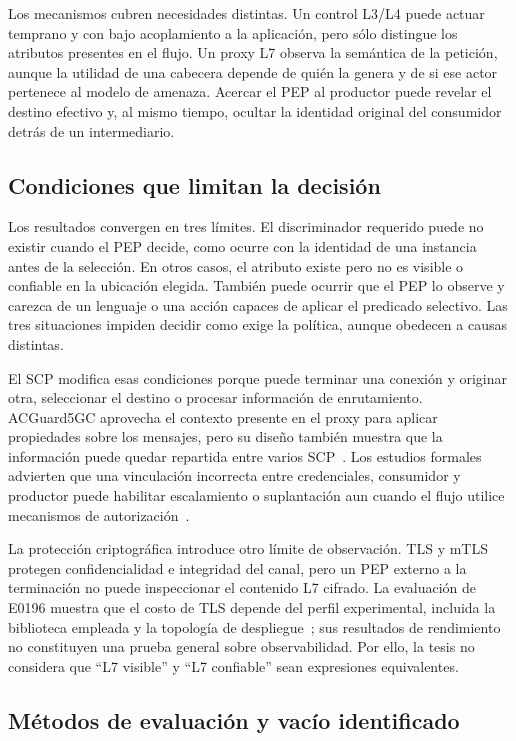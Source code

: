 Los mecanismos cubren necesidades distintas. Un control L3/L4 puede actuar temprano y con bajo acoplamiento a la aplicación, pero sólo distingue los atributos presentes en el flujo. Un proxy L7 observa la semántica de la petición, aunque la utilidad de una cabecera depende de quién la genera y de si ese actor pertenece al modelo de amenaza. Acercar el PEP al productor puede revelar el destino efectivo y, al mismo tiempo, ocultar la identidad original del consumidor detrás de un intermediario.

\subsection{Condiciones que limitan la decisión}
\label{subsec:seleccion-visibilidad}

Los resultados convergen en tres límites. El discriminador requerido puede no existir cuando el PEP decide, como ocurre con la identidad de una instancia antes de la selección. En otros casos, el atributo existe pero no es visible o confiable en la ubicación elegida. También puede ocurrir que el PEP lo observe y carezca de un lenguaje o una acción capaces de aplicar el predicado selectivo. Las tres situaciones impiden decidir como exige la política, aunque obedecen a causas distintas.

El SCP modifica esas condiciones porque puede terminar una conexión y originar otra, seleccionar el destino o procesar información de enrutamiento. ACGuard5GC aprovecha el contexto presente en el proxy para aplicar propiedades sobre los mensajes, pero su diseño también muestra que la información puede quedar repartida entre varios SCP~\cite{E0061}. Los estudios formales advierten que una vinculación incorrecta entre credenciales, consumidor y productor puede habilitar escalamiento o suplantación aun cuando el flujo utilice mecanismos de autorización~\cite{E0066,E0036}.

La protección criptográfica introduce otro límite de observación. TLS y mTLS protegen confidencialidad e integridad del canal, pero un PEP externo a la terminación no puede inspeccionar el contenido L7 cifrado. La evaluación de E0196 muestra que el costo de TLS depende del perfil experimental, incluida la biblioteca empleada y la topología de despliegue~\cite{E0196}; sus resultados de rendimiento no constituyen una prueba general sobre observabilidad. Por ello, la tesis no considera que ``L7 visible'' y ``L7 confiable'' sean expresiones equivalentes.

\subsection{Métodos de evaluación y vacío identificado}
\label{subsec:validacion-corpus}

